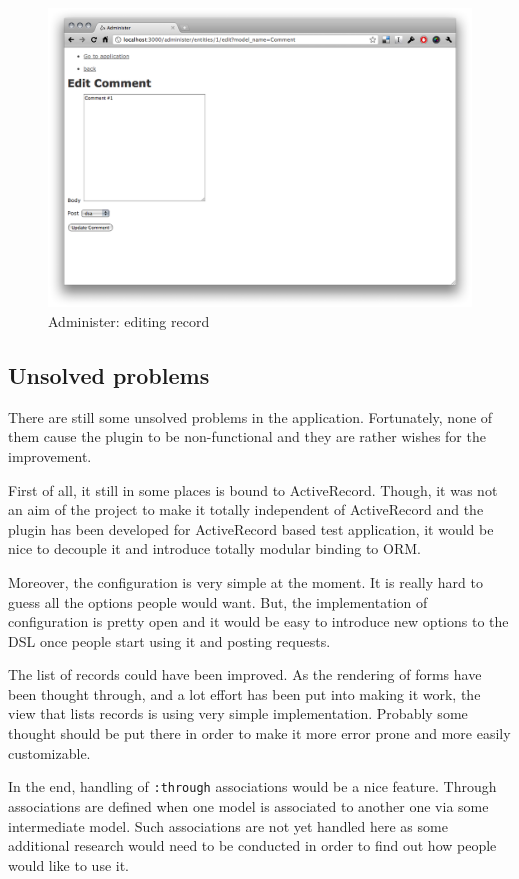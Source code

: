     	\begin{figure}[hbt!]
    		\begin{center}
    			\includegraphics[width = 0.8\linewidth]{images/chapter05/outcome3.png}
    			\caption{Administer: editing record}
    			\label{outcome3}
    		\end{center}
    	\end{figure}
      
    \subsection{Unsolved problems}
      \label{ch:implementation:unsolved_problems}
      There are still some unsolved problems in the application. Fortunately, none of them
      cause the plugin to be non-functional and they are rather wishes for the improvement.
      
      First of all, it still in some places is bound to ActiveRecord. 
      Though, it was not an aim of the project to make it totally independent of ActiveRecord 
      and the plugin has been developed for ActiveRecord based test application, it would be nice
      to decouple it and introduce totally modular binding to ORM. 
      
      Moreover, the configuration is very simple at the moment. It is really hard to
      guess all the options people would want. But, the implementation of configuration
      is pretty open and it would be easy to introduce new options to the DSL once
      people start using it and posting requests.
      
      The list of records could have been improved. As the rendering of forms
      have been thought through, and a lot effort has been put into making it
      work, the view that lists records is using very simple implementation. Probably
      some thought should be put there in order to make it more error prone and more 
      easily customizable.
      
      In the end, handling of \texttt{:through} associations would be a nice feature.
      Through associations are defined when one model is associated to another one 
      via some intermediate model. Such associations are not yet handled here as
      some additional research would need to be conducted in order to find out
      how people would like to use it.
      
      